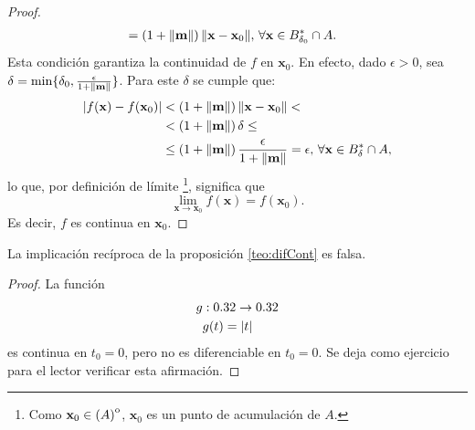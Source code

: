 \begin{theorem}
\begin{proof}
\begin{align*}
                      &=  \left( 1 + \norm{\mathbf{m}} \right) \norm{\mathbf{x} - \mathbf{x}_0}, \, 
                      \forall \mathbf{x} \in B^*_{\delta_0} \cap A.
\end{align*}
Esta condici\'on garantiza la continuidad de $f$ en $\mathbf{x}_0$. En efecto, dado $\epsilon > 0$, sea $\delta = \min \{\delta_0, \frac{\epsilon}{1 + \norm{\mathbf{m}}} \}$. Para este $\delta$ se cumple que:
\begin{align*}
 \abs{ f(\mathbf{x}) - f(\mathbf{x}_0) } &< \left( 1 + \norm{\mathbf{m}} \right) \norm{\mathbf{x} - \mathbf{x}_0} < \\
                       &<   \left( 1 + \norm{\mathbf{m}} \right) \delta \le \\
                       &\le \left( 1 + \norm{\mathbf{m}} \right) \frac{\epsilon}{1 + \norm{\mathbf{m}}} = \epsilon, 
                       \, \forall \mathbf{x} \in B^*_{\delta} \cap A,
\end{align*}
lo que, por definici\'on de l\'imite \footnote{Como $\mathbf{x}_0 \in {\kern0pt(A)}^{\mathrm{o}}$, $\mathbf{x}_0$ es un punto de acumulaci\'on de $A$. }, significa que 
\[
 \lim_{\mathbf{x} \to \mathbf{x}_0}f(\mathbf{x}) = f(\mathbf{x}_0).
\]
Es decir, $f$ es continua en $\mathbf{x}_0$.
\end{proof}
\begin{obs} La implicaci\'on rec\'iproca de la proposici\'on \eqref{teo:difCont} es falsa. 
 \begin{proof} La funci\'on
  \begin{align*}
      g & :0.32 \to 0.32 \\
        & g(t) = \abs{t}
 \end{align*}
es continua en $t_0 = 0$, pero no es diferenciable en $t_0 = 0$. Se deja como ejercicio para el lector verificar esta afirmaci\'on.
 \end{proof}
\end{obs}
\end{theorem}

